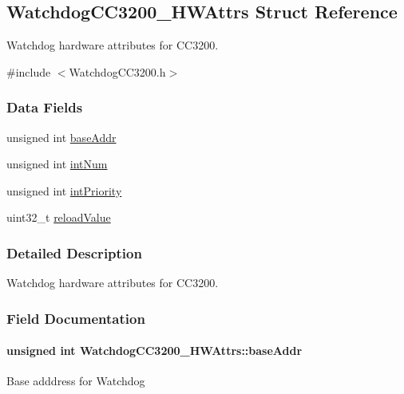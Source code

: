 \subsection{Watchdog\+C\+C3200\+\_\+\+H\+W\+Attrs Struct Reference}
\label{struct_watchdog_c_c3200___h_w_attrs}


Watchdog hardware attributes for C\+C3200.  




{\ttfamily \#include $<$Watchdog\+C\+C3200.\+h$>$}

\subsubsection*{Data Fields}
\begin{DoxyCompactItemize}
\item 
unsigned int \hyperlink{struct_watchdog_c_c3200___h_w_attrs_a008443f1add564e22b829e525cd4505f}{base\+Addr}
\item 
unsigned int \hyperlink{struct_watchdog_c_c3200___h_w_attrs_a49a550cfb37091acc532cfe0330a1c15}{int\+Num}
\item 
unsigned int \hyperlink{struct_watchdog_c_c3200___h_w_attrs_a3e770e95811c62d92e8c4b9307e2c6be}{int\+Priority}
\item 
uint32\+\_\+t \hyperlink{struct_watchdog_c_c3200___h_w_attrs_a746d7acdd50828840459d4d78171d780}{reload\+Value}
\end{DoxyCompactItemize}


\subsubsection{Detailed Description}
Watchdog hardware attributes for C\+C3200. 

\subsubsection{Field Documentation}
\paragraph[{base\+Addr}]{\setlength{\rightskip}{0pt plus 5cm}unsigned int Watchdog\+C\+C3200\+\_\+\+H\+W\+Attrs\+::base\+Addr}\label{struct_watchdog_c_c3200___h_w_attrs_a008443f1add564e22b829e525cd4505f}
Base adddress for Watchdog 
